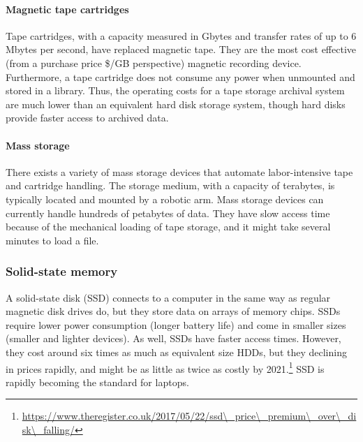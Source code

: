 \documentclass[
]{article}
\begin{document}
\hypertarget{magnetic-tape-cartridges}{%
\paragraph*{Magnetic tape cartridges}\label{magnetic-tape-cartridges}}

Tape cartridges, with a capacity measured in Gbytes and transfer rates
of up to 6 Mbytes per second, have replaced magnetic tape. They are the
most cost effective (from a purchase price \$/GB perspective) magnetic
recording device. Furthermore, a tape cartridge does not consume any
power when unmounted and stored in a library. Thus, the operating costs
for a tape storage archival system are much lower than an equivalent
hard disk storage system, though hard disks provide faster access to
archived data.

\hypertarget{mass-storage}{%
\paragraph*{Mass storage}\label{mass-storage}}

There exists a variety of mass storage devices that automate
labor-intensive tape and cartridge handling. The storage medium, with a
capacity of terabytes, is typically located and mounted by a robotic
arm. Mass storage devices can currently handle hundreds of petabytes of
data. They have slow access time because of the mechanical loading of
tape storage, and it might take several minutes to load a file.

\hypertarget{solid-state-memory}{%
\subsubsection*{Solid-state memory}\label{solid-state-memory}}

A solid-state disk (SSD) connects to a computer in the same way as
regular magnetic disk drives do, but they store data on arrays of memory
chips. SSDs require lower power consumption (longer battery life) and
come in smaller sizes (smaller and lighter devices). As well, SSDs have
faster access times. However, they cost around six times as much as
equivalent size HDDs, but they declining in prices rapidly, and might be
as little as twice as costly by 2021.\footnote{\href{https://www.theregister.co.uk/2017/05/22/ssd_price_premium_over_disk_falling/}{https://www.theregister.co.uk/2017/05/22/ssd\textbackslash\_price\textbackslash\_premium\textbackslash\_over\textbackslash\_disk\textbackslash\_falling/}} SSD is rapidly becoming the
standard for laptops.
\end{document}
